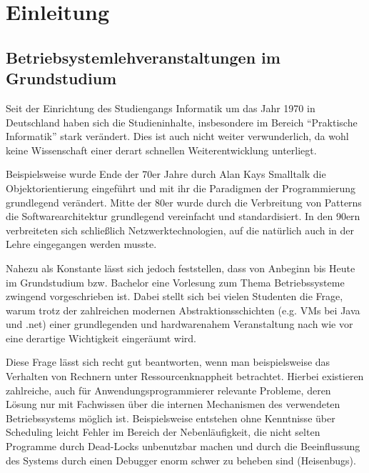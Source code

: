 \chapter{Einleitung}
\label{chap:introduction}


\section{Betriebsystemlehveranstaltungen im Grundstudium}
\label{sec:motivation}

		Seit der Einrichtung des Studiengangs Informatik um das Jahr 1970 in Deutschland haben sich die Studieninhalte, insbesondere im Bereich "`Praktische Informatik"' stark verändert.
		Dies ist auch nicht weiter verwunderlich, da wohl keine Wissenschaft einer derart schnellen Weiterentwicklung unterliegt.

		Beispielsweise wurde Ende der 70er Jahre durch Alan Kays Smalltalk die Objektorientierung eingeführt und mit ihr die Paradigmen der Programmierung grundlegend verändert.
		Mitte der 80er wurde durch die Verbreitung von Patterns die Softwarearchitektur grundlegend vereinfacht und standardisiert.
		In den 90ern verbreiteten sich schließlich Netzwerktechnologien, auf die natürlich auch in der Lehre eingegangen werden musste.

		Nahezu als Konstante lässt sich jedoch feststellen, dass von Anbeginn bis Heute im Grundstudium bzw. Bachelor eine Vorlesung zum Thema Betriebssysteme zwingend vorgeschrieben ist.
		Dabei stellt sich bei vielen Studenten die Frage, warum trotz der zahlreichen modernen Abstraktionsschichten (e.g. VMs bei Java und .net) einer grundlegenden und hardwarenahem Veranstaltung nach wie vor eine derartige Wichtigkeit eingeräumt wird.


		Diese Frage lässt sich recht gut beantworten, wenn man beispielsweise das Verhalten von Rechnern unter Ressourcenknappheit betrachtet. Hierbei existieren zahlreiche, auch für Anwendungsprogrammierer relevante Probleme, deren Lösung nur mit Fachwissen über die internen Mechanismen des verwendeten Betriebssystems möglich ist. 
		Beispielsweise entstehen ohne Kenntnisse über Scheduling leicht Fehler im Bereich der Nebenläufigkeit, die nicht selten Programme durch Dead-Locks unbenutzbar machen und durch die Beeinflussung des Systems durch einen Debugger enorm schwer zu beheben sind (Heisenbugs).




